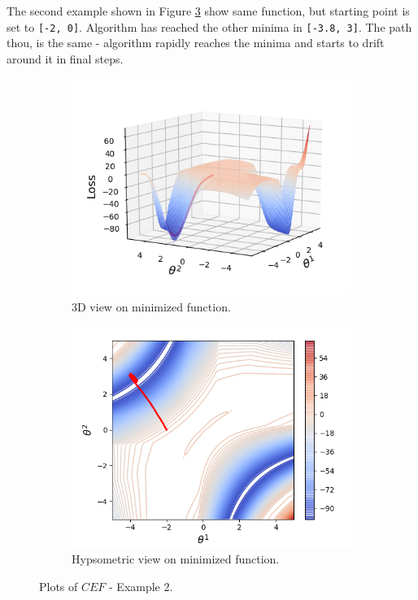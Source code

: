 \documentclass[11pt,a4paper]{IEEEtran}
\begin{document}
The second example shown in Figure \ref{fig:ex4} show same function, but starting point is set to \texttt{[-2, 0]}. Algorithm has reached the other minima in \texttt{[-3.8, 3]}. The path thou, is the same - algorithm rapidly reaches the minima and starts to drift around it in final steps.

\begin{figure}[!hbt]
\centering
	\begin{subfigure}[b]{0.47\textwidth}
		\includegraphics[width=\textwidth]{examples/4/3d.png}
		\caption{3D view on minimized function.}
		\label{fig:ex4:3d-view}
	\end{subfigure}
	\begin{subfigure}[b]{0.47\textwidth}
		\includegraphics[width=\textwidth]{examples/4/2d.png}
		\caption{Hypsometric view on minimized function.}
		\label{fig:ex4:hypsometric}
	\end{subfigure}
	\caption{Plots of $CEF$ - Example 2.}
	\label{fig:ex4}
\end{figure}
\end{document}
